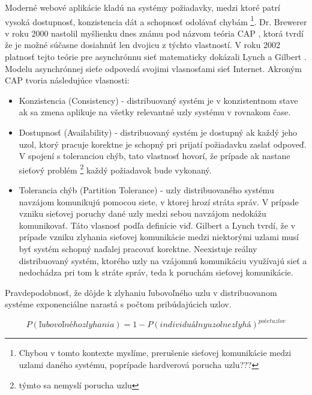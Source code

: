 \documentclass[11pt,twoside,a4paper]{book}
\begin{document}
Moderné webové aplikácie kladú na systémy požiadavky, medzi ktoré patrí vysoká dostupnosť, konzistencia dát a schopnosť odolávať chybám \footnote{Chybou v tomto kontexte myslíme, prerušenie sieťovej komunikácie medzi uzlami daného systému, poprípade hardverová porucha uzlu???}. Dr. Brewerer v roku 2000 nastolil myšlienku dnes známu pod názvom teória CAP \cite{BrewerCAP}, ktorá tvrdí že je možné súčasne dosiahnúť len dvojicu z týchto vlastností. V roku 2002 platnosť tejto teórie pre asynchrónnu sieť matematicky dokázali Lynch a Gilbert \cite{LynchCAP}. Modelu asynchrónnej sieťe odpovedá svojimi vlasnosťami sieť Internet. Akroným CAP tvoria následujúce vlasnosti:
\begin{itemize}
 \item 
  Konzistencia (Consistency) - distribuovaný systém je v konzistentnom stave ak sa zmena aplikuje na všetky relevantné uzly systému v rovnakom čase. 
  \item
  Dostupnosť (Availability) - distribuovaný systém je dostupný ak každý jeho uzol, ktorý pracuje korektne je schopný pri prijatí požiadavku zaslať odpoveď. V spojení s toleranciou chýb, tato vlastnosť hovorí, že prípade ak nastane sieťový problém \footnote{týmto sa nemyslí porucha uzlu} každý požiadavok bude vykonaný.
\item
  Tolerancia chýb (Partition Tolerance) - uzly distribuovaného systému navzájom komunikujú pomocou siete, v ktorej hrozí stráta správ. V prípade vzniku sieťovej poruchy dané uzly medzi sebou navzájom nedokážu komunikovať. Táto vlasnosť podľa definície viď. Gilbert a Lynch tvrdí, že v prípade vzniku zlyhania sieťovej komunikácie medzi niektorými uzlami musí byť systém schopný naďalej pracovať korektne. Neexistuje reálny distribuovaný systém, ktorého uzly na vzájomnú komunikáciu využívajú sieť a nedochádza pri tom k stráte správ, teda k poruchám sieťovej komunikácie.
\end{itemize}

Pravdepodobnosť, že dôjde k zlyhaniu ľubovoľného uzlu v distribuovanom systéme exponenciálne narastá s počtom pribúdajúcich uzlov.

$$P(ľubovoľného zlyhania) = 1 - P(individuálny uzol nezlyhá)^{počet uzlov}$$
\end{document}
